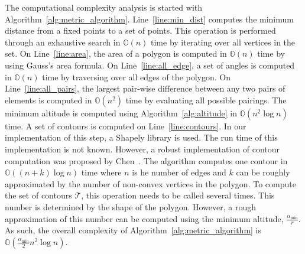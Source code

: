 \documentclass[../main.tex]{subfiles}
\begin{document}
The computational complexity analysis is started with Algorithm~\ref{alg:metric_algorithm}. Line~\ref{line:min_dist} computes the minimum distance from a fixed points to a set of points. This operation is performed through an exhaustive search in $\mathbb{O}(n)$ time by iterating over all vertices in the set. On Line~\ref{line:area}, the area of a polygon is computed in $\mathbb{O}(n)$ time by using Gauss's area formula. On Line~\ref{line:all_edge}, a set of angles is computed in $\mathbb{O}(n)$ time by traversing over all edges of the polygon. On Line~\ref{line:all_pairs}, the largest pair-wise difference between any two pairs of elements is computed in $\mathbb{O}(n^2)$ time by evaluating all possible pairings. The minimum altitude is computed using Algorithm~\ref{alg:altitude} in $\mathbb{O}(n^2\log{n})$ time. A set of contours is computed on Line~\ref{line:contours}. In our implementation of this step, a Shapely library is used. The run time of this implementation is not known. However, a robust implementation of contour computation was proposed by Chen~\cite{chen2005polygon}. The algorithm computes one contour in $\mathbb{O}((n+k)\log{n})$ time where $n$ is he number of edges and $k$ can be roughly approximated by the number of non-convex vertices in the polygon. To compute the set of contours $\mathcal{T}$, this operation needs to be called several times. This number is determined by the shape of the polygon. However, a rough approximation of this number can be computed using the minimum altitude, $\frac{\alpha_{\min}}{r}$. As such, the overall complexity of Algorithm~\ref{alg:metric_algorithm} is $\mathbb{O}(\frac{\alpha_{\min}}{2}n^2\log{n})$.
\end{document}

